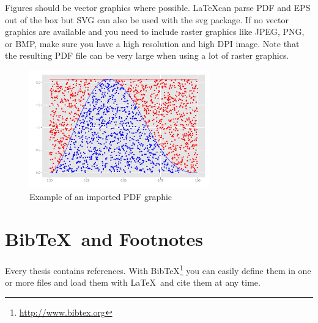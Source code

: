 \documentclass[bachelorarbeit,grey]{mas-thesis-sections}				%
\begin{document}
Figures should be vector graphics where possible. \LaTeX can parse PDF and EPS out of the box but SVG can also be used with the svg package. If no vector graphics are available and you need to include raster graphics like JPEG, PNG, or BMP, make sure you have a high resolution and high DPI image. Note that the resulting PDF file can be very large when using a lot of raster graphics.

\begin{figure}[ht]
	\centering
	\includegraphics[height=5.1cm]{graphics/demo-graphic.pdf}
	\caption{Example of an imported PDF graphic}
	\label{figure:1}
\end{figure}

\newpage

\section{Bib\TeX\ and Footnotes}

Every thesis contains references. With Bib\TeX\footnote{\url{http://www.bibtex.org}} you can easily define them in one or more files and load them with \LaTeX\ and cite them at any time.\cite{exampleBook}
\cleardoublepage

\printbibliography

\makelicensepageCCBYSA


% 
% 
% 
% 
% 
% 




\end{document}
